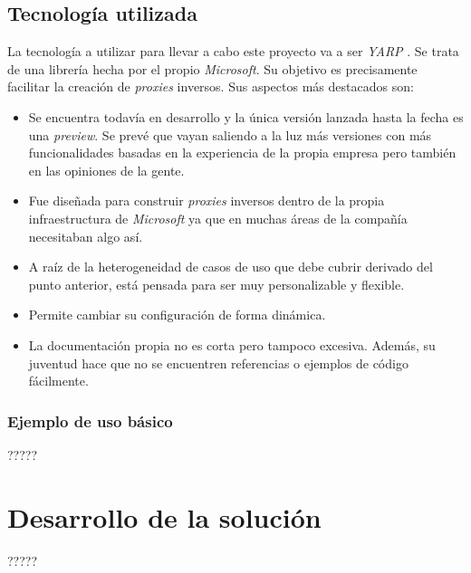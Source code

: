 \documentclass[11pt,spanish,listoffigures]{tfgetsinf}
\begin{document}
\section{Tecnología utilizada}

La tecnología a utilizar para llevar a cabo este proyecto va a ser \emph{YARP} \cite{YARP}. Se trata de una librería hecha por el propio \emph{Microsoft}. Su objetivo es precisamente facilitar la creación de \emph{proxies} inversos. Sus aspectos más destacados son:

\begin{itemize}

\item Se encuentra todavía en desarrollo y la única versión lanzada hasta la fecha es una \emph{preview}. Se prevé que vayan saliendo a la luz más versiones con más funcionalidades basadas en la experiencia de la propia empresa pero también en las opiniones de la gente.
\item Fue diseñada para construir \emph{proxies} inversos dentro de la propia infraestructura de \emph{Microsoft} ya que en muchas áreas de la compañía necesitaban algo así.
\item A raíz de la heterogeneidad de casos de uso que debe cubrir derivado del punto anterior, está pensada para ser muy personalizable y flexible.
\item Permite cambiar su configuración de forma dinámica.
\item La documentación propia no es corta pero tampoco excesiva. Además, su juventud hace que no se encuentren referencias o ejemplos de código fácilmente.

\end{itemize}

\subsection{Ejemplo de uso básico}

?????


\chapter{Desarrollo de la solución}

?????

\end{document}
